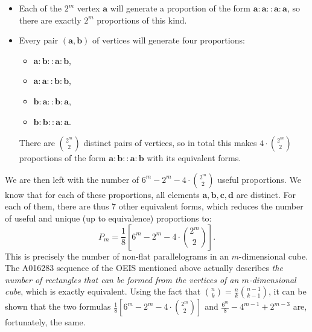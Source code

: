\begin{itemize}
  \item Each of the $2^m$ vertex $\mathbf{a}$ will generate a proportion of the
    form $\mathbf{a}: \mathbf{a} :: \mathbf{a} : \mathbf{a}$, so there are
    exactly $2^m$ proportions of this kind.
  \item Every pair $(\mathbf{a}, \mathbf{b})$ of vertices will generate four
    proportions:
    \begin{itemize}
      \item $\mathbf{a}: \mathbf{b} :: \mathbf{a} : \mathbf{b}$,
      \item $\mathbf{a}: \mathbf{a} :: \mathbf{b} : \mathbf{b}$,
      \item $\mathbf{b}: \mathbf{a} :: \mathbf{b} : \mathbf{a}$,
      \item $\mathbf{b}: \mathbf{b} :: \mathbf{a} : \mathbf{a}$.
    \end{itemize}
    There are $\binom{2^m}{2}$ distinct pairs of vertices, so in total this
    makes $4\cdot \binom{2^m}{2}$ proportions of the form $\mathbf{a}: \mathbf{b} ::
    \mathbf{a} : \mathbf{b}$ with its equivalent forms.
\end{itemize}

We are then left with the number of $6^m - 2^m - 4\cdot\binom{2^m}{2}$ useful
proportions. We know that for each of these proportions, all elements
$\mathbf{a}, \mathbf{b}, \mathbf{c}, \mathbf{d}$  are distinct. For each of
them, there are thus 7 other equivalent forms, which reduces the number of
useful and unique (up to equivalence) proportions to:
$$P_m = \frac{1}{8} \left[6^m - 2^m - 4\cdot\binom{2^m}{2} \right].$$
This is precisely the number of non-flat parallelograms in an $m$-dimensional
cube. The A016283 sequence of the OEIS mentioned above actually describes
\textit{the number of rectangles that can be formed from the vertices of an
$m$-dimensional cube}, which is exactly equivalent. Using
the fact that $\binom{n}{k} = \frac{n}{k}\binom{n - 1}{k - 1}$, it can be shown
that the two formulas $\frac{1}{8} \left[6^m - 2^m - 4\cdot\binom{2^m}{2} \right]$
and $\frac{6^m}{8} - 4^{m - 1} + 2^{m- 3}$ are, fortunately, the same.

